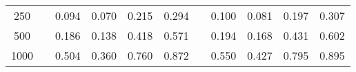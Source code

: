 % 
\begin{tabular}{ccccccccccc}
  \hline
  \hline
250 &  & 0.094 & 0.070 & 0.215 & 0.294 &  & 0.100 & 0.081 & 0.197 & 0.307 \\ 
  500 &  & 0.186 & 0.138 & 0.418 & 0.571 &  & 0.194 & 0.168 & 0.431 & 0.602 \\ 
  1000 &  & 0.504 & 0.360 & 0.760 & 0.872 &  & 0.550 & 0.427 & 0.795 & 0.895 \\ 
   \hline
\end{tabular}

